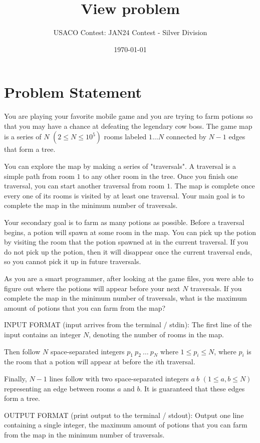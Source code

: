 \documentclass[12pt]{article}
\title{View problem}
\author{USACO Contest: JAN24 Contest - Silver Division}
\date{\today}
\begin{document}
\maketitle

\section*{Problem Statement}


You are playing your favorite mobile game and you are trying to farm potions so
that you  may have a chance at defeating the legendary cow boss. The game map is a
series of $N$ $(2 \leq N \leq 10^5)$ rooms labeled $1\dots N$  connected by
$N-1$ edges that form a tree. 

You can explore the map by making a series of "traversals". A traversal is a
simple path from room $1$ to any other room in the tree. Once you finish one
traversal, you can start another traversal from room $1$. The map is complete
once every one of its rooms is visited by at least one traversal. Your main goal
is to complete the map in the minimum number of traversals. 

Your secondary goal is to farm as many potions as possible. Before a traversal
begins, a potion will spawn at some room in the map. You can pick up the potion
by visiting the room that the potion spawned at in the current traversal. If you
do not pick up the potion, then it will disappear once the current traversal
ends, so you cannot pick it up in future traversals.

As you are a smart programmer, after looking at the game files, you were able to
figure out where the potions will appear before your next $N$ traversals. If you
complete the map in the minimum number of traversals, what is the maximum amount
of potions that you can farm from the map?  

INPUT FORMAT (input arrives from the terminal / stdin):
The first line of the input contains an integer $N$, denoting  the number of
rooms in the map.

Then follow $N$ space-separated integers $p_1 \: p_2 \: \ldots \: p_N$ where 
$1 \leq p_i \leq N$, where $p_i$ is the room that a potion will appear at before
the $i$th traversal.

Finally, $N-1$ lines follow with two space-separated integers $a \: b$
$(1 \leq a, b \leq N)$  representing an edge between rooms $a$ and $b$. It is
guaranteed that these edges form a tree.


OUTPUT FORMAT (print output to the terminal / stdout):
Output one line containing a single integer, the maximum amount of potions  that
you can farm from the map in the minimum number of traversals. 
\end{document}
